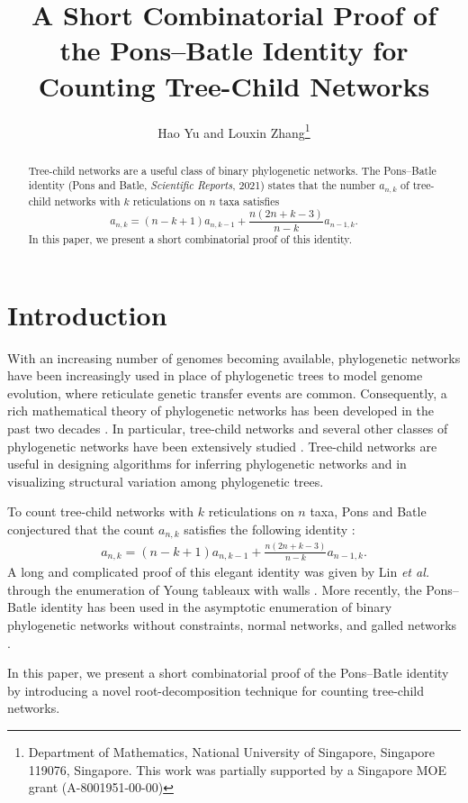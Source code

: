 \documentclass[11pt]{article}
\title{A Short Combinatorial Proof of the Pons--Batle Identity for Counting Tree-Child Networks}
\author{Hao Yu and Louxin Zhang\thanks{Department of Mathematics, National University of Singapore, Singapore 119076, Singapore. This work was partially supported by a Singapore MOE grant (A-8001951-00-00)}}
\date{}
\theoremstyle{definition}
\theoremstyle{remark}
\begin{document}
\maketitle

\begin{abstract}
Tree-child networks are a useful class of binary phylogenetic networks.
The Pons--Batle identity (Pons and Batle, \textit{Scientific Reports}, 2021)
states that the number $a_{n,k}$ of tree-child networks with $k$
reticulations on $n$ taxa satisfies
\[
a_{n,k}=(n-k+1)a_{n,k-1}
+\frac{n(2n+k-3)}{n-k}a_{n-1,k}.
\]
In this paper, we present a short combinatorial proof of this identity.
\end{abstract}

\section{Introduction}

With an increasing number of genomes becoming available, phylogenetic networks have been increasingly used in place of phylogenetic trees to model genome evolution, where reticulate genetic transfer events are common. Consequently, a rich mathematical theory of phylogenetic networks has been developed in the past two decades \cite{huson_book, steel_book}. In particular, tree-child networks \cite{Cardona_09b} and several other classes of phylogenetic networks have been extensively studied \cite{huson_book, Zhang2019clusters}. Tree-child networks are useful in designing algorithms for inferring phylogenetic networks \cite{zhang2026phylofusion} and in visualizing structural variation among phylogenetic trees.

To count tree-child networks with  $k$ reticulations on  $n$ taxa, Pons and Batle conjectured that the count $a_{n, k}$ satisfies the following identity \cite{Conjecture_Pons}:
\begin{eqnarray}
a_{n,k}=(n-k+1)a_{n,k-1}
+\frac{n(2n+k-3)}{n-k}a_{n-1,k}.
\label{conjecture}
\end{eqnarray}
A long and complicated proof of this elegant identity was given by Lin {\it et al.} \cite{Conjecture_proof} through the enumeration of Young tableaux with walls \cite{liu2026combinatorial}. More recently, the Pons--Batle identity has been used in the asymptotic enumeration of binary phylogenetic networks without constraints, normal networks, and galled networks \cite{YFuchs_2026,YZhang_2026}.

In this paper, we present a short combinatorial proof of the Pons--Batle identity by introducing a novel root-decomposition technique for counting tree-child networks.
\end{document}
